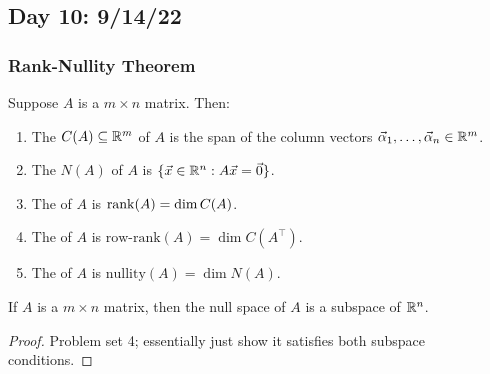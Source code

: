 \documentclass[main.tex]{subfiles}
\begin{document}
\subsection{Day 10: 9/14/22}

\subsubsection{Rank-Nullity Theorem}
\begin{definition}
    Suppose $A$ is a $m\times n$ matrix. Then:
    \begin{enumerate}
        \item The  $C(A)\subseteq \mathbb R^m$ of $A$ is the span of the column vectors $\vec{\alpha}_1, \ldots , \vec{\alpha}_n\in \mathbb R^m$.
        \item The  $N(A)$ of $A$ is $\{\vec{x}\in \mathbb R^n : A\vec{x} = \vec{0}\}$.
        \item The  of $A$ is $\operatorname{rank}(A) = \dim C(A)$.
        \item The  of $A$ is $\text{row-rank}(A) = \dim C(A^\top)$.
        \item The  of $A$ is $\text{nullity}(A) = \dim N(A)$.
    \end{enumerate}
\end{definition}

\begin{proposition}
    If $A$ is a $m\times n$ matrix, then the null space of $A$ is a subspace of $\mathbb R^n$.
\end{proposition}
\begin{proof}
    Problem set 4; essentially just show it satisfies both subspace conditions.
\end{proof}
\end{document}
